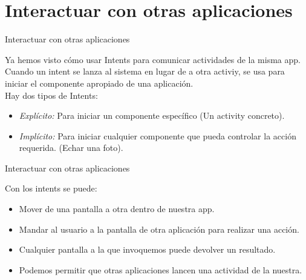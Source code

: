 \section{Interactuar con otras aplicaciones}
\begin{frame}{Interactuar con otras aplicaciones}
    \begin{block}{}
        Ya hemos visto cómo usar Intents para comunicar actividades de la misma app. Cuando un intent se lanza
        al sistema en lugar de a otra activiy, se usa para iniciar el componente apropiado de una aplicación.\\
        Hay dos tipos de Intents:
    \end{block}
    \begin{itemize}
        \pause
        \item {
            \emph{Explícito:} Para iniciar un componente específico (Un activity concreto).\pause
        }
        \item<1->{
            \emph{Implícito:} Para iniciar cualquier componente que pueda controlar la acción requerida. (Echar una foto).
        }
    \end{itemize}
\end{frame}

\begin{frame}{Interactuar con otras aplicaciones}
    \begin{block}{}
        Con los intents se puede:
    \end{block}
    \begin{itemize}
        \item {
            Mover de una pantalla a otra dentro de nuestra app.\pause
        }
        \item {
            Mandar al usuario a la pantalla de otra aplicación para realizar una acción.
        }
        \item<3->{
            Cualquier pantalla a la que invoquemos puede devolver un resultado.
        }
        \item<4->{
            Podemos permitir que otras aplicaciones lancen una actividad de la nuestra.
        }
    \end{itemize}
\end{frame}
